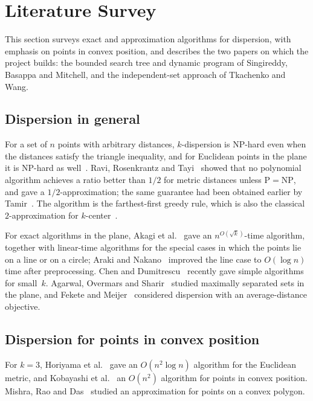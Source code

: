 \chapter{Literature Survey}\label{ch:lit}

\begin{chapterabstract}
This section surveys exact and approximation algorithms for dispersion,
with emphasis on points in convex position, and describes the two papers on
which the project builds: the bounded search tree and dynamic program of
Singireddy, Basappa and Mitchell, and the independent-set approach of
Tkachenko and Wang.
\end{chapterabstract}

\section{Dispersion in general}

For a set of $n$ points with arbitrary distances, $k$-dispersion is NP-hard
even when the distances satisfy the triangle inequality, and for Euclidean
points in the plane it is NP-hard as well~\citep{wangkuo}. Ravi, Rosenkrantz
and Tayi~\citep{ravi} showed that no polynomial algorithm achieves a ratio
better than $1/2$ for metric distances unless $\mathrm{P}=\mathrm{NP}$, and gave a
$1/2$-approximation; the same guarantee had been obtained earlier by
Tamir~\citep{tamir}. The algorithm is the farthest-first greedy rule, which is
also the classical $2$-approximation for $k$-center~\citep{gonzalez}.

For exact algorithms in the plane, Akagi et al.~\citep{akagi} gave an
$n^{O(\sqrt k)}$-time algorithm, together with linear-time algorithms for the
special cases in which the points lie on a line or on a circle; Araki and
Nakano~\citep{arakinakano} improved the line case to $O(\log n)$ time after
preprocessing. Chen and Dumitrescu~\citep{chendumitrescu} recently gave simple
algorithms for small~$k$. Agarwal, Overmars and Sharir~\citep{agarwal} studied
maximally separated sets in the plane, and Fekete and
Meijer~\citep{feketemeijer} considered dispersion with an average-distance
objective.

\section{Dispersion for points in convex position}

For $k=3$, Horiyama et al.~\citep{horiyama} gave an $O(n^2\log n)$ algorithm
for the Euclidean metric, and Kobayashi et al.~\citep{kobayashi} an $O(n^2)$
algorithm for points in convex position. Mishra, Rao and
Das~\citep{mishra} studied an approximation for points on a convex polygon.

